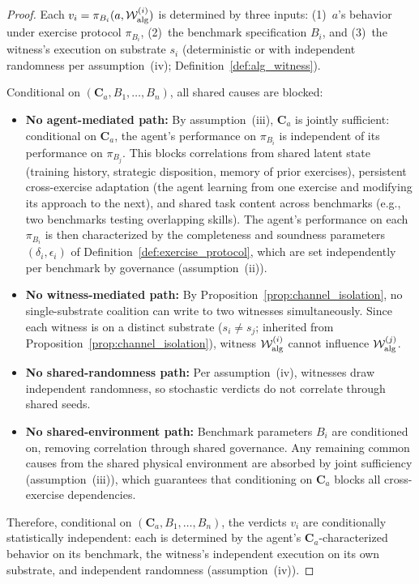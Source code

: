 \begin{proof}
Each $v_i = \pi_{B_i}(a, \mathcal{W}^{(i)}_{\mathrm{alg}})$ is determined
by three inputs: (1)~$a$'s behavior under exercise protocol $\pi_{B_i}$,
(2)~the benchmark specification $B_i$, and (3)~the witness's
execution on substrate $s_i$ (deterministic or with independent
randomness per assumption~(iv);
Definition~\ref{def:alg_witness}).

Conditional on $(\mathbf{C}_a, B_1, \ldots, B_n)$, all shared causes
are blocked:
\begin{itemize}
    \item \textbf{No agent-mediated path:}  By assumption~(iii),
    $\mathbf{C}_a$ is jointly sufficient: conditional on
    $\mathbf{C}_a$, the agent's performance on $\pi_{B_i}$ is
    independent of its performance on $\pi_{B_j}$.  This blocks
    correlations from shared latent state (training history, strategic
    disposition, memory of prior exercises), persistent cross-exercise
    adaptation (the agent learning from one exercise and modifying its
    approach to the next), and shared task content across benchmarks
    (e.g., two benchmarks testing overlapping skills).  The agent's
    performance on each $\pi_{B_i}$ is then characterized by the
    completeness and soundness parameters $(\delta_i, \epsilon_i)$ of
    Definition~\ref{def:exercise_protocol}, which are set independently
    per benchmark by governance (assumption~(ii)).
    \item \textbf{No witness-mediated path:}  By
    Proposition~\ref{prop:channel_isolation}, no single-substrate
    coalition can write to two witnesses simultaneously.  Since each
    witness is on a distinct substrate ($s_i \neq s_j$; inherited from
    Proposition~\ref{prop:channel_isolation}),
    witness $\mathcal{W}^{(i)}_{\mathrm{alg}}$ cannot influence
    $\mathcal{W}^{(j)}_{\mathrm{alg}}$.
    \item \textbf{No shared-randomness path:}  Per assumption~(iv),
    witnesses draw independent randomness, so stochastic verdicts
    do not correlate through shared seeds.
    \item \textbf{No shared-environment path:}  Benchmark parameters
    $B_i$ are conditioned on, removing correlation through shared
    governance.  Any remaining common causes from the shared physical
    environment are absorbed by joint sufficiency (assumption~(iii)),
    which guarantees that conditioning on $\mathbf{C}_a$ blocks all
    cross-exercise dependencies.
\end{itemize}
Therefore, conditional on $(\mathbf{C}_a, B_1, \ldots, B_n)$, the
verdicts $v_i$ are conditionally statistically independent: each is
determined by the agent's $\mathbf{C}_a$-characterized behavior on its
benchmark, the witness's independent execution on its own substrate,
and independent randomness (assumption~(iv)).
\end{proof}

